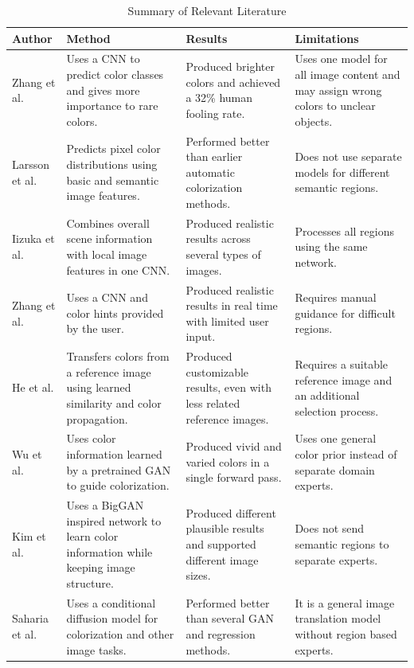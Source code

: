 \documentclass{FastFyp}
\begin{document}
\begin{longtable}{|p{2.5cm}|p{4.2cm}|p{4.2cm}|p{3.8cm}|}
\caption{Summary of Relevant Literature}\label{tab:literature-summary}\\
\hline
\textbf{Author} & \textbf{Method} & \textbf{Results} & \textbf{Limitations} \\
\hline
\endhead
\hline
\endlastfoot
Zhang et al. \cite{ref1} & Uses a CNN to predict color classes and gives more importance to rare colors. & Produced brighter colors and achieved a 32\% human fooling rate. & Uses one model for all image content and may assign wrong colors to unclear objects. \\
\hline
Larsson et al. \cite{refLarsson} & Predicts pixel color distributions using basic and semantic image features. & Performed better than earlier automatic colorization methods. & Does not use separate models for different semantic regions. \\
\hline
Iizuka et al. \cite{ref2} & Combines overall scene information with local image features in one CNN. & Produced realistic results across several types of images. & Processes all regions using the same network. \\
\hline
Zhang et al. \cite{ref3} & Uses a CNN and color hints provided by the user. & Produced realistic results in real time with limited user input. & Requires manual guidance for difficult regions. \\
\hline
He et al. \cite{ref4} & Transfers colors from a reference image using learned similarity and color propagation. & Produced customizable results, even with less related reference images. & Requires a suitable reference image and an additional selection process. \\
\hline
Wu et al. \cite{ref6} & Uses color information learned by a pretrained GAN to guide colorization. & Produced vivid and varied colors in a single forward pass. & Uses one general color prior instead of separate domain experts. \\
\hline
Kim et al. \cite{ref7} & Uses a BigGAN inspired network to learn color information while keeping image structure. & Produced different plausible results and supported different image sizes. & Does not send semantic regions to separate experts. \\
\hline
Saharia et al. \cite{ref8} & Uses a conditional diffusion model for colorization and other image tasks. & Performed better than several GAN and regression methods. & It is a general image translation model without region based experts. \\

\end{longtable}
\end{document}
